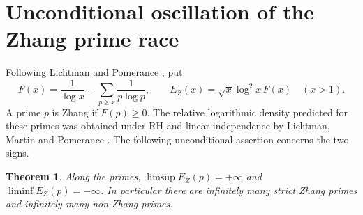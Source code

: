 \documentclass[11pt,a4paper]{article}
\newtheorem{theorem}{Theorem}[section]
\begin{document}
\section{Unconditional oscillation of the Zhang prime race}
Following Lichtman and Pomerance \cite[Sec.~5]{lpzh}, put
\[
 F(x)=\frac1{\log x}-\sum_{p\ge x}\frac1{p\log p},
 \qquad E_Z(x)=\sqrt{x}\log^2x\,F(x)\quad(x>1).
\]
A prime $p$ is Zhang if $F(p)\ge0$.  The relative logarithmic density
predicted for these primes was obtained under RH and linear independence
by Lichtman, Martin and Pomerance \cite[Thm.~5.6]{lmp}.
The following unconditional assertion concerns the two signs.
\begin{theorem}\label{thm:zhang}
Along the primes, $\limsup E_Z(p)=+\infty$ and
$\liminf E_Z(p)=-\infty$.  In particular there are infinitely many
strict Zhang primes and infinitely many non-Zhang primes.
\end{theorem}
\end{document}
